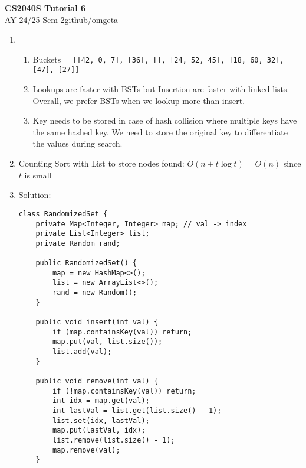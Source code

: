 \documentclass[12pt, a4paper]{article}
\newcommand{\mytitle}{CS2040S Tutorial 6}
\newcommand{\myauthor}{github/omgeta}
\newcommand{\mydate}{AY 24/25 Sem 2}
\begin{document}
\raggedright
\footnotesize
\begin{center}
{\normalsize{\textbf{\mytitle}}} \\
{\footnotesize{\mydate\hspace{2pt}\textemdash\hspace{2pt}\myauthor}}
\end{center}
\begin{enumerate}[Q\arabic*.]
  \item 
    \begin{enumerate}[(\alph*.)]
      \item Buckets = \lstinline|[[42, 0, 7], [36], [], [24, 52, 45], [18, 60, 32], [47], [27]]|

      \item Lookups are faster with BSTs but Insertion are faster with linked lists. Overall, we prefer BSTs when we lookup more than insert.

      \item Key needs to be stored in case of hash collision where multiple keys have the same hashed key. We need to store the original key to differentiate the values during search.
    \end{enumerate}

  \item Counting Sort with List to store nodes found: $O(n+t\log t)=O(n)$ since $t$ is small

  \item Solution: 
  \begin{lstlisting}
class RandomizedSet {
    private Map<Integer, Integer> map; // val -> index
    private List<Integer> list;
    private Random rand;

    public RandomizedSet() {
        map = new HashMap<>();
        list = new ArrayList<>();
        rand = new Random();
    }

    public void insert(int val) {
        if (map.containsKey(val)) return;
        map.put(val, list.size());
        list.add(val);
    }

    public void remove(int val) {
        if (!map.containsKey(val)) return;
        int idx = map.get(val);
        int lastVal = list.get(list.size() - 1);
        list.set(idx, lastVal);
        map.put(lastVal, idx);
        list.remove(list.size() - 1);
        map.remove(val);
    }


\end{lstlisting}
\end{enumerate}
\end{document}
